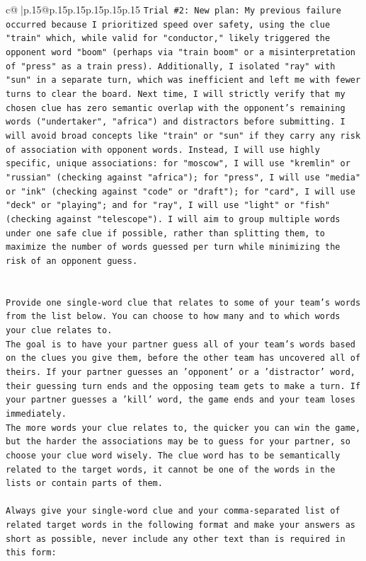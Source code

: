 \documentclass{article}
\begin{document}
{\begin{supertabular}{c@{$\;$}|p{.15\linewidth}@{}p{.15\linewidth}p{.15\linewidth}p{.15\linewidth}p{.15\linewidth}p{.15\linewidth}}
{{{\texttt{Trial \#2: New plan: My previous failure occurred because I prioritized speed over safety, using the clue "train" which, while valid for "conductor," likely triggered the opponent word "boom" (perhaps via "train boom" or a misinterpretation of "press" as a train press). Additionally, I isolated "ray" with "sun" in a separate turn, which was inefficient and left me with fewer turns to clear the board. Next time, I will strictly verify that my chosen clue has zero semantic overlap with the opponent's remaining words ("undertaker", "africa") and distractors before submitting. I will avoid broad concepts like "train" or "sun" if they carry any risk of association with opponent words. Instead, I will use highly specific, unique associations: for "moscow", I will use "kremlin" or "russian" (checking against "africa"); for "press", I will use "media" or "ink" (checking against "code" or "draft"); for "card", I will use "deck" or "playing"; and for "ray", I will use "light" or "fish" (checking against "telescope"). I will aim to group multiple words under one safe clue if possible, rather than splitting them, to maximize the number of words guessed per turn while minimizing the risk of an opponent guess.} \\
\\ 
\\ 
\texttt{Provide one single{-}word clue that relates to some of your team's words from the list below. You can choose to how many and to which words your clue relates to.} \\
\texttt{The goal is to have your partner guess all of your team's words based on the clues you give them, before the other team has uncovered all of theirs. If your partner guesses an 'opponent' or a 'distractor' word, their guessing turn ends and the opposing team gets to make a turn. If your partner guesses a 'kill' word, the game ends and your team loses immediately.} \\
\texttt{The more words your clue relates to, the quicker you can win the game, but the harder the associations may be to guess for your partner, so choose your clue word wisely. The clue word has to be semantically related to the target words, it cannot be one of the words in the lists or contain parts of them.} \\
\\ 
\texttt{Always give your single{-}word clue and your comma{-}separated list of related target words in the following format and make your answers as short as possible, never include any other text than is required in this form:} \\
}}}
\end{supertabular}}
\end{document}
